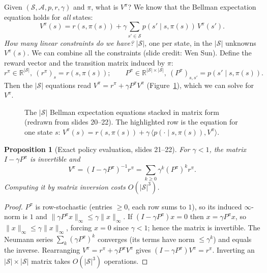 \documentclass[11pt,a4paper]{article}
\newcommand{\R}{\mathbb{R}}
\newcommand{\cS}{\mathcal{S}}
\newcommand{\cA}{\mathcal{A}}
\newcommand{\norm}[1]{\lVert #1\rVert_\infty}
\theoremstyle{plain}
\newtheorem{proposition}{Proposition}\renewcommand{\theproposition}{S\arabic{proposition}}
\theoremstyle{definition}
\theoremstyle{remark}
\newcommand{\figref}[1]{Figure~\ref{#1}}
\begin{document}
Given $(\cS,\cA,p,r,\gamma)$ and $\pi$, what is $V^\pi$? We know that the Bellman expectation equation holds for \emph{all} states:
\[
V^\pi(s)=r(s,\pi(s))+\gamma\sum_{s'\in\cS}p(s'\mid s,\pi(s))\,V^\pi(s').
\]
\emph{How many linear constraints do we have?} $|\cS|$, one per state, in the $|\cS|$ unknowns $V^\pi(s)$. We can combine all the constraints (slide credit: Wen Sun). Define the reward vector and the transition matrix induced by $\pi$:
\[
r^\pi\in\R^{|\cS|},\ (r^\pi)_s=r(s,\pi(s));\qquad
P^\pi\in\R^{|\cS|\times|\cS|},\ (P^\pi)_{s,s'}=p(s'\mid s,\pi(s)).
\]
Then the $|\cS|$ equations read $V^\pi=r^\pi+\gamma P^\pi V^\pi$ (\figref{fig:matrix}), which we can solve for $V^\pi$.

\begin{figure}[htbp]
\centering
{}
\caption{The $|\cS|$ Bellman expectation equations stacked in matrix form (redrawn from slides 20--22). The highlighted row is the equation for one state $s$: $V^\pi(s)=r(s,\pi(s))+\gamma\,\langle p(\cdot\mid s,\pi(s)),V^\pi\rangle$.}
\label{fig:matrix}
\end{figure}

\begin{proposition}[Exact policy evaluation, slides 21--22]\label{prop:exact}
For $\gamma<1$, the matrix $I-\gamma P^\pi$ is invertible and
\[
V^\pi=(I-\gamma P^\pi)^{-1}r^\pi=\sum_{k\ge0}\gamma^k(P^\pi)^kr^\pi .
\]
Computing it by matrix inversion costs $O(|\cS|^3)$.
\end{proposition}
\begin{proof}
$P^\pi$ is row-stochastic (entries $\ge0$, each row sums to $1$), so its induced $\infty$-norm is $1$ and $\norm{\gamma P^\pi x}\le\gamma\norm{x}$. If $(I-\gamma P^\pi)x=0$ then $x=\gamma P^\pi x$, so $\norm{x}\le\gamma\norm{x}$, forcing $x=0$ since $\gamma<1$; hence the matrix is invertible. The Neumann series $\sum_k(\gamma P^\pi)^k$ converges (its terms have norm $\le\gamma^k$) and equals the inverse. Rearranging $V^\pi=r^\pi+\gamma P^\pi V^\pi$ gives $(I-\gamma P^\pi)V^\pi=r^\pi$. Inverting an $|\cS|\times|\cS|$ matrix takes $O(|\cS|^3)$ operations.
\end{proof}
\end{document}
